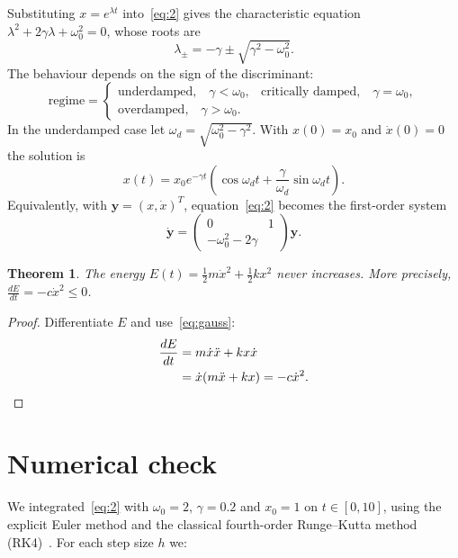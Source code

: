 \documentclass[11pt,a4paper]{article}
\newtheorem{theorem}{Theorem}
\begin{document}
Substituting $x=e^{\lambda t}$ into~\eqref{eq:2} gives the characteristic equation $\lambda^{2}+2\gamma\lambda+\omega_{0}^{2}=0$, whose roots are
\begin{equation}
  \lambda_{\pm}=-\gamma\pm\sqrt{\gamma^{2}-\omega_{0}^{2}}.
\end{equation}
The behaviour depends on the sign of the discriminant:
\begin{equation*}
  \text{regime}=\begin{cases}
\text{underdamped,}\quad\gamma<\omega_{0}, & \text{critically damped,}\quad\gamma=\omega_{0}, \\
\text{overdamped,}\quad\gamma>\omega_{0}. & 
\end{cases}
\end{equation*}
In the underdamped case let $\omega_{d}=\sqrt{\omega_{0}^{2}-\gamma^{2}}$. With $x(0)=x_{0}$ and $\dot{x}(0)=0$ the solution is
\begin{equation}
  x(t)=x_{0}e^{-\gamma t}\left( \cos\omega_{d}t+\frac{\gamma}{\omega_{d}}\sin\omega_{d}t \right).
  \label{eq:cos-dsin}
\end{equation}
Equivalently, with $\mathbf{y}=(x,\dot{x})^{T}$, equation~\eqref{eq:2} becomes the first-order system
\begin{equation}
  \dot{\mathbf{y}}=\begin{pmatrix}
0 & 1 \\
-\omega_{0}^{2}-2\gamma & 
\end{pmatrix}\mathbf{y}.
\end{equation}

\begin{theorem}
  The energy $E(t)=\frac{1}{2}m\dot{x}^{2}+\frac{1}{2}kx^{2}$ never increases. More precisely, $\frac{dE}{dt}=-c\dot{x}^{2}\leq0$.
\end{theorem}

\begin{proof}
  Differentiate $E$ and use~\eqref{eq:gauss}:
\begin{align*}
  \frac{dE}{dt} &=m\dot{x}\ddot{x}+kx\dot{x} \\
   &=\dot{x}(m\ddot{x}+kx)=-c\dot{x}^{2}. \qedhere
\end{align*}
\end{proof}

\section{Numerical check}

We integrated~\eqref{eq:2} with $\omega_{0}=2$, $\gamma=0.2$ and $x_{0}=1$ on $t\in[0,10]$, using the explicit Euler method and the classical fourth-order Runge--Kutta method (RK4)~\cite{ref2}. For each step size $h$ we:
\end{document}
